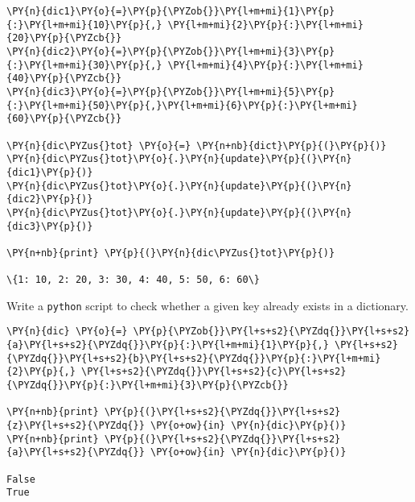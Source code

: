 \begin{Answer}
\begin{codebox}[size=fbox, boxrule=1pt, colback=cellbackground, colframe=cellborder]
\begin{Verbatim}[commandchars=\\\{\}]
\PY{n}{dic1}\PY{o}{=}\PY{p}{\PYZob{}}\PY{l+m+mi}{1}\PY{p}{:}\PY{l+m+mi}{10}\PY{p}{,} \PY{l+m+mi}{2}\PY{p}{:}\PY{l+m+mi}{20}\PY{p}{\PYZcb{}}
\PY{n}{dic2}\PY{o}{=}\PY{p}{\PYZob{}}\PY{l+m+mi}{3}\PY{p}{:}\PY{l+m+mi}{30}\PY{p}{,} \PY{l+m+mi}{4}\PY{p}{:}\PY{l+m+mi}{40}\PY{p}{\PYZcb{}}
\PY{n}{dic3}\PY{o}{=}\PY{p}{\PYZob{}}\PY{l+m+mi}{5}\PY{p}{:}\PY{l+m+mi}{50}\PY{p}{,}\PY{l+m+mi}{6}\PY{p}{:}\PY{l+m+mi}{60}\PY{p}{\PYZcb{}}

\PY{n}{dic\PYZus{}tot} \PY{o}{=} \PY{n+nb}{dict}\PY{p}{(}\PY{p}{)}
\PY{n}{dic\PYZus{}tot}\PY{o}{.}\PY{n}{update}\PY{p}{(}\PY{n}{dic1}\PY{p}{)}
\PY{n}{dic\PYZus{}tot}\PY{o}{.}\PY{n}{update}\PY{p}{(}\PY{n}{dic2}\PY{p}{)}
\PY{n}{dic\PYZus{}tot}\PY{o}{.}\PY{n}{update}\PY{p}{(}\PY{n}{dic3}\PY{p}{)}

\PY{n+nb}{print} \PY{p}{(}\PY{n}{dic\PYZus{}tot}\PY{p}{)}

\{1: 10, 2: 20, 3: 30, 4: 40, 5: 50, 6: 60\}
\end{Verbatim}
\end{codebox}
\end{Answer}

\begin{Exercise}
Write a \texttt{python} script to check whether a given key already exists in a dictionary.
\end{Exercise}

\begin{Answer}
\begin{codebox}[size=fbox, boxrule=1pt, colback=cellbackground, colframe=cellborder]
\begin{Verbatim}[commandchars=\\\{\}]
\PY{n}{dic} \PY{o}{=} \PY{p}{\PYZob{}}\PY{l+s+s2}{\PYZdq{}}\PY{l+s+s2}{a}\PY{l+s+s2}{\PYZdq{}}\PY{p}{:}\PY{l+m+mi}{1}\PY{p}{,} \PY{l+s+s2}{\PYZdq{}}\PY{l+s+s2}{b}\PY{l+s+s2}{\PYZdq{}}\PY{p}{:}\PY{l+m+mi}{2}\PY{p}{,} \PY{l+s+s2}{\PYZdq{}}\PY{l+s+s2}{c}\PY{l+s+s2}{\PYZdq{}}\PY{p}{:}\PY{l+m+mi}{3}\PY{p}{\PYZcb{}}

\PY{n+nb}{print} \PY{p}{(}\PY{l+s+s2}{\PYZdq{}}\PY{l+s+s2}{z}\PY{l+s+s2}{\PYZdq{}} \PY{o+ow}{in} \PY{n}{dic}\PY{p}{)}
\PY{n+nb}{print} \PY{p}{(}\PY{l+s+s2}{\PYZdq{}}\PY{l+s+s2}{a}\PY{l+s+s2}{\PYZdq{}} \PY{o+ow}{in} \PY{n}{dic}\PY{p}{)}

False
True
\end{Verbatim}
\end{codebox}
\end{Answer}

